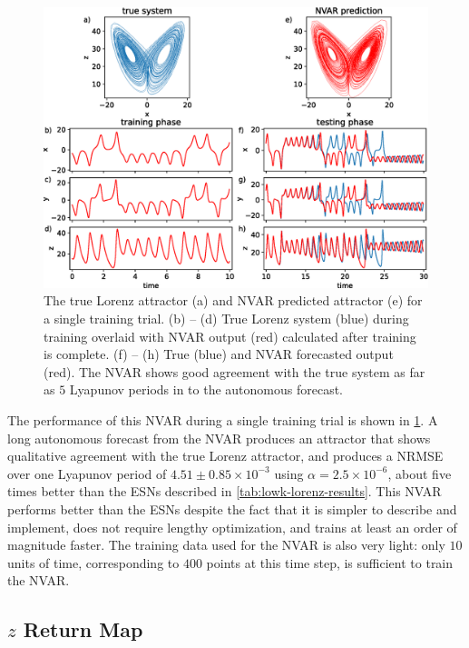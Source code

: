 \begin{figure}
  \includegraphics[width=\textwidth]{figures/nvar-predict-lorenz}
  \caption{The true Lorenz attractor (a) and NVAR predicted attractor
    (e) for a single training trial. (b) -- (d) True Lorenz system
    (blue) during training overlaid with NVAR output (red) calculated
    after training is complete. (f) -- (h) True (blue) and NVAR
    forecasted output (red). The NVAR shows good agreement with the
    true system as far as $5$ Lyapunov periods in to the autonomous
    forecast.}
  \label{fig:nvar-predict-lorenz}
\end{figure}

The performance of this NVAR during a single training trial is shown
in \cref{fig:nvar-predict-lorenz}. A long autonomous forecast from the
NVAR produces an attractor that shows qualitative agreement with the
true Lorenz attractor, and produces a NRMSE over one Lyapunov period
of $4.51\pm0.85\times10^{-3}$ using $\alpha = 2.5\times10^{-6}$, about
five times better than the ESNs described in
\cref{tab:lowk-lorenz-results}. This NVAR performs better than the
ESNs despite the fact that it is simpler to describe and implement,
does not require lengthy optimization, and trains at least an order of
magnitude faster. The training data used for the NVAR is also very
light: only $10$ units of time, corresponding to $400$ points at this
time step, is sufficient to train the NVAR.

\subsection{$z$ Return Map}

